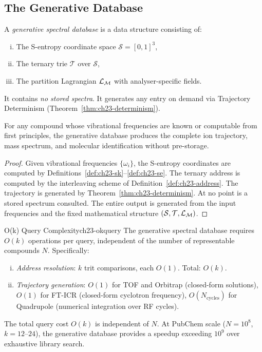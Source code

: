 \subsection{The Generative Database}
\label{sec:ch23-gen-db}

\begin{definition}
\label{def:ch23-gen-db}
A \emph{generative spectral database} is a data structure consisting of:
\begin{enumerate}[(i)]
  \item The S-entropy coordinate space $\mathcal{S} = [0,1]^3$,
  \item The ternary trie $\mathcal{T}$ over $\mathcal{S}$,
  \item The partition Lagrangian $\mathcal{L}_{\mathcal{M}}$ with analyser-specific fields.
\end{enumerate}
It contains \emph{no stored spectra}.  It generates any entry on demand via
Trajectory Determinism (Theorem~\ref{thm:ch23-determinism}).
\end{definition}

\begin{theorem}
\label{thm:ch23-completeness}
For any compound whose vibrational frequencies are known or computable from
first principles, the generative database produces the complete ion trajectory,
mass spectrum, and molecular identification without pre-storage.
\end{theorem}

\begin{proof}
Given vibrational frequencies $\{\omega_i\}$, the S-entropy coordinates are
computed by Definitions~\ref{def:ch23-sk}--\ref{def:ch23-se}.  The ternary
address is computed by the interleaving scheme of Definition~\ref{def:ch23-address}.
The trajectory is generated by Theorem~\ref{thm:ch23-determinism}.  At no
point is a stored spectrum consulted.  The entire output is generated from
the input frequencies and the fixed mathematical structure
$(\mathcal{S}, \mathcal{T}, \mathcal{L}_{\mathcal{M}})$.
\end{proof}

\begin{consequence}{O(k) Query Complexity}{ch23-okquery}
The generative spectral database requires $O(k)$ operations per query,
independent of the number of representable compounds $N$.  Specifically:
\begin{enumerate}[(i)]
  \item \emph{Address resolution}: $k$ trit comparisons, each $O(1)$.
    Total: $O(k)$.
  \item \emph{Trajectory generation}: $O(1)$ for TOF and Orbitrap
    (closed-form solutions), $O(1)$ for FT-ICR (closed-form cyclotron
    frequency), $O(N_{\mathrm{cycles}})$ for Quadrupole (numerical
    integration over RF cycles).
\end{enumerate}
The total query cost $O(k)$ is independent of $N$.  At PubChem scale
($N = 10^8$, $k = 12$--$24$), the generative database provides a speedup
exceeding $10^9$ over exhaustive library search.
\end{consequence}

